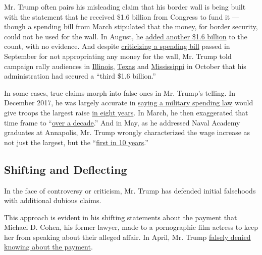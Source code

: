 Mr. Trump often pairs his misleading claim that his border wall is being
built with the statement that he received \$1.6 billion from Congress to
fund it --- though a spending bill from March stipulated that the money,
for border security, could not be used for the wall. In August, he
\href{https://www.youtube.com/watch?v=izMFU8g6uBo}{added another \$1.6
billion} to the count, with no evidence. And despite
\href{https://twitter.com/realDonaldTrump/status/1042740913968164864}{criticizing
a spending bill} passed in September for not appropriating any money for
the wall, Mr. Trump told campaign rally audiences in
\href{https://www.c-span.org/video/?453628-1/president-trump-campaigns-republicans-illinois\&start=1920}{Illinois},
\href{https://www.c-span.org/video/?453256-1/president-trump-campaigns-senator-ted-cruz-houston\&start=1526}{Texas}
and
\href{https://www.c-span.org/video/?452371-1/president-trump-holds-rally-mississippi\&start=2935}{Mississippi}
in October that his administration had secured a ``third \$1.6
billion.''

In some cases, true claims morph into false ones in Mr. Trump's telling.
In December 2017, he was largely accurate in
\href{https://www.whitehouse.gov/briefings-statements/remarks-president-trump-marine-helicopter-squadron-one/}{saying
a military spending law} would give troops the largest raise
\href{https://fas.org/sgp/crs/natsec/IF10260.pdf\#page=2}{in eight
years}. In March, he then exaggerated that time frame to
``\href{https://www.nytimes3xbfgragh.onion/2018/03/23/us/politics/fact-check-military-pay-immigrants.html}{over
a decade}.'' And in May, as he addressed Naval Academy graduates at
Annapolis, Mr. Trump wrongly characterized the wage increase as not just
the largest, but the
``\href{https://www.nytimes3xbfgragh.onion/2018/05/25/us/politics/fact-check-trump-naval-academy-speech.html}{first
in 10 years}.''

\hypertarget{shifting-and-deflecting}{%
\subsection{Shifting and Deflecting}\label{shifting-and-deflecting}}

In the face of controversy or criticism, Mr. Trump has defended initial
falsehoods with additional dubious claims.

This approach is evident in his shifting statements about the payment
that Michael D. Cohen, his former lawyer, made to a pornographic film
actress to keep her from speaking about their alleged affair. In April,
Mr. Trump
\href{https://www.whitehouse.gov/briefings-statements/remarks-president-trump-press-gaggle-en-route-washington-d-c/}{falsely
denied knowing about the payment}.

